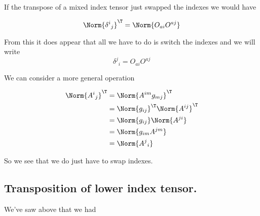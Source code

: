 If the transpose of a mixed index tensor just swapped the indexes we would have

\begin{equation}\label{eqn:relativisticElectrodynamicsL11:1060}
\Norm{ {\delta^i}_j }^\T = \Norm{ O_{a i} O^{a j} } 
\end{equation}

From this it does appear that all we have to do is switch the indexes and we will write
\begin{equation}\label{eqn:relativisticElectrodynamicsL11:1060b}
{\delta^j}_i = O_{a i} O^{a j} 
\end{equation}

We can consider a more general operation

\begin{align*}
\Norm{{A^i}_j}^\T
&=
\Norm{ A^{i m} g_{m j} }^\T \\
&=
\Norm{ g_{i j} }^\T
\Norm{ A^{i j} }^\T 
 \\
&=
\Norm{ g_{i j} }
\Norm{ A^{j i} }
 \\
&=
\Norm{ g_{i m} A^{j m} }
 \\
&=
\Norm{ {A^{j}}_i }
\end{align*}

So we see that we do just have to swap indexes.

%
%
%
%

\subsection{Transposition of lower index tensor.}

We've saw above that we had

